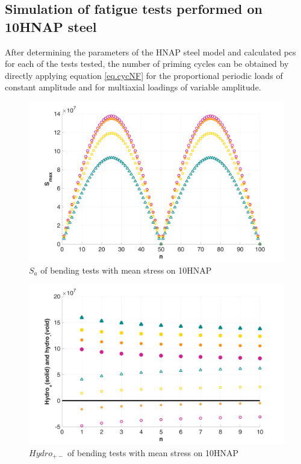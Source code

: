 \subsection{Simulation of fatigue tests performed on 10HNAP steel}
After determining the parameters of the HNAP steel model and calculated pcs for each of the tests tested, the number of priming cycles can be obtained by directly applying equation \eqref{eq.cycNF} for the proportional periodic loads of constant amplitude and for multiaxial loadings of variable amplitude.
\begin{figure}[!h]
	\centering
	\includegraphics[width=\textwidth]{figures//10HNAP_b1D_m_Smax.png} 
	\caption{$S_{a}$ of bending tests with mean stress on 10HNAP}
	\label{fig.10HNAPSmax}
\end{figure}
\begin{figure}[!h]
	\centering
	\includegraphics[width=\textwidth]{figures//10HNAP_b1D_m_hydro.png} 
	\caption{$Hydro_{+-}$ of bending tests with mean stress on 10HNAP}
	\label{fig.10HNAPhydro}
\end{figure}

